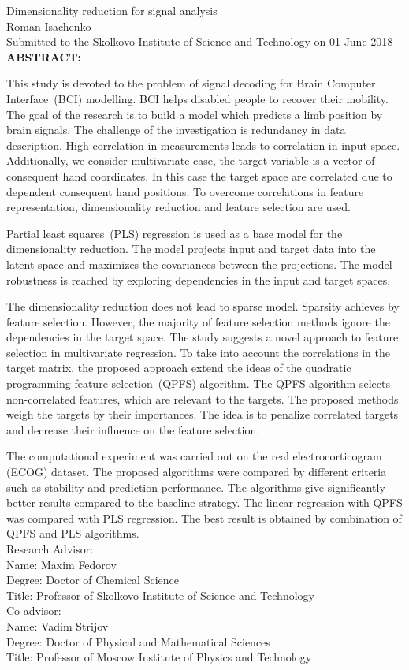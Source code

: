 \documentclass[12pt,oneside]{article}
\theoremstyle{definition}
\begin{document}
	\thispagestyle{empty}

\begin{center}
	Dimensionality reduction for signal analysis\\ 
	Roman Isachenko \\[5mm]
	Submitted to the Skolkovo Institute of Science and Technology 
	on 01 June 2018 \\[5mm]
	\textbf{ABSTRACT:} 
\end{center}

This study is devoted to the problem of signal decoding for Brain Computer Interface~(BCI) modelling. 
BCI helps disabled people to recover their mobility.
The goal of the research is to build a model which predicts a limb position by brain signals. 
The challenge of the investigation is redundancy in data description. 
High correlation in measurements leads to correlation in input space. 
Additionally, we consider multivariate case, the target variable is a vector of consequent hand coordinates. 
In this case the target space are correlated due to dependent consequent hand positions.
To overcome correlations in feature representation, dimensionality reduction and feature selection are used.

Partial least squares~(PLS) regression is used as a base model for the dimensionality reduction.
The model projects input and target data into the latent space and maximizes the covariances between the projections.
The model robustness is reached by exploring dependencies in the input and target spaces.

The dimensionality reduction does not lead to sparse model. Sparsity achieves by feature selection.
However, the majority of feature selection methods ignore the dependencies in the target space.
The study suggests a novel approach to feature selection in multivariate regression.
To take into account the correlations in the target matrix, the proposed approach extend the ideas of the quadratic programming feature selection~(QPFS) algorithm. 
The QPFS algorithm selects non-correlated features, which are relevant to the targets. The proposed methods weigh the targets by their importances. The idea is to penalize correlated targets and decrease their influence on the feature selection. 

The computational experiment was carried out on the real electrocorticogram (ECOG) dataset. 
The proposed algorithms were compared by different criteria such as stability and prediction performance.
The algorithms give significantly better results compared to the baseline strategy.
The linear regression with QPFS was compared with PLS regression.
The best result is obtained by combination of QPFS and PLS algorithms.\\[5mm]
Research Advisor: \\
Name: Maxim Fedorov \\
Degree: Doctor of Chemical Science \\
Title: Professor of Skolkovo Institute of Science and Technology \\[5mm]
Co-advisor: \\
Name: Vadim Strijov \\
Degree: Doctor of Physical and Mathematical Sciences  \\
Title: Professor of Moscow Institute of Physics and Technology
\end{document}
